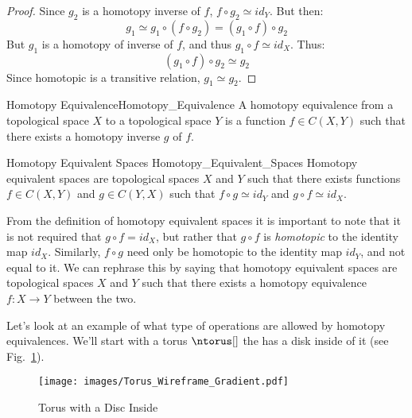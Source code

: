\documentclass{article}                                                        %
\begin{document}
        \begin{proof}
            Since $g_{2}$ is a homotopy inverse of $f$,
            $f\circ{g}_{2}\simeq{id}_{Y}$. But then:
            \begin{equation}
                g_{1}\simeq{g}_{1}\circ(f\circ{g}_{2})
                =(g_{1}\circ{f})\circ{g}_{2}
            \end{equation}
            But $g_{1}$ is a homotopy of inverse of $f$,
            and thus $g_{1}\circ{f}\simeq{id}_{X}$. Thus:
            \begin{equation}
                (g_{1}\circ{f})\circ{g}_{2}\simeq{g}_{2}
            \end{equation}
            Since homotopic is a transitive relation, $g_{1}\simeq{g}_{2}$.
        \end{proof}
        \begin{ldefinition}{Homotopy Equivalence}{Homotopy_Equivalence}
            A homotopy equivalence from a topological space $X$ to a
            topological space $Y$ is a function $f\in{C}(X,Y)$ such that
            there exists a homotopy inverse $g$ of $f$.
        \end{ldefinition}
        \begin{ldefinition}{Homotopy Equivalent Spaces}
                           {Homotopy_Equivalent_Spaces}
            Homotopy equivalent spaces are topological spaces $X$ and $Y$
            such that there exists functions ${f}\in{C(X,Y)}$ and
            ${g}\in{C(Y,X)}$ such that ${f}\circ{g}\simeq{id_{Y}}$
            and ${g}\circ{f}\simeq{id_{X}}$.
        \end{ldefinition}
        From the definition of homotopy equivalent spaces it is important
        to note that it is not required that $g\circ{f}=id_{X}$, but rather
        that $g\circ{f}$ is \textit{homotopic} to the identity map $id_{X}$.
        Similarly, $f\circ{g}$ need only be homotopic to the identity map
        $id_{Y}$, and not equal to it. We can rephrase this by saying that
        homotopy equivalent spaces are topological spaces $X$ and $Y$ such
        that there exists a homotopy equivalence $f:X\rightarrow{Y}$
        between the two.
        \par\hfill\par
        Let's look at an example of what type of operations are allowed by
        homotopy equivalences. We'll start with a torus $\ntorus[]$ the has a
        disk inside of it (see Fig.~\ref{fig:Torus_with_Disc_Inside}).
        \begin{figure}[H]
            \centering
            \captionsetup{type=figure}
            \texttt{[image: images/Torus\_Wireframe\_Gradient.pdf]}
            \caption{Torus with a Disc Inside}
            \label{fig:Torus_with_Disc_Inside}
        \end{figure}
\end{document}
